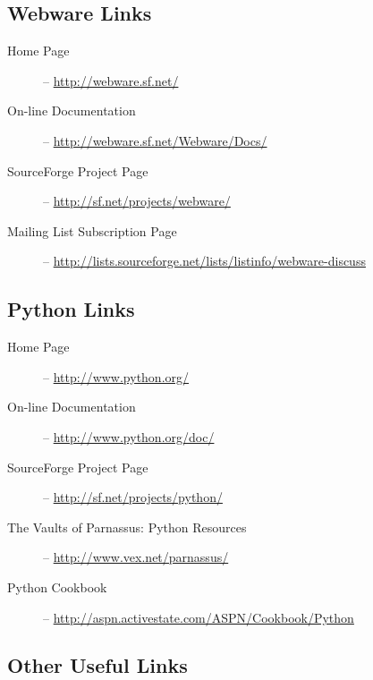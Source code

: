 \subsection{Webware Links}
\label{links.webware}

\begin{description}
\item[Home Page] -- \url{http://webware.sf.net/}
     
\item[On-line Documentation] -- \url{http://webware.sf.net/Webware/Docs/}
     
\item[SourceForge Project Page] -- \url{http://sf.net/projects/webware/}
     
\item[Mailing List Subscription Page] --
     \url{http://lists.sourceforge.net/lists/listinfo/webware-discuss}

\end{description}

\subsection{Python Links}
\label{links.python}

\begin{description}
\item[Home Page] -- \url{http://www.python.org/}
\item[On-line Documentation] -- \url{http://www.python.org/doc/}
\item[SourceForge Project Page] -- \url{http://sf.net/projects/python/}
\item[The Vaults of Parnassus: Python Resources] --
     \url{http://www.vex.net/parnassus/}
\item[Python Cookbook] -- \url{http://aspn.activestate.com/ASPN/Cookbook/Python}
\end{description}

\subsection{Other Useful Links}
\label{links.other}


